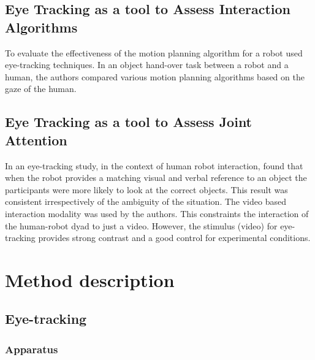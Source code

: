 \documentclass{sig-alternate}
\begin{document}
\subsection{Eye Tracking as a tool to Assess Interaction Algorithms}

To evaluate the effectiveness of the motion planning algorithm for a robot \cite{dehais2011physiological} used eye-tracking techniques. In an object hand-over task between a robot and a human, the authors compared various motion planning algorithms based on the gaze of the human.

\subsection{Eye Tracking as a tool to Assess Joint Attention}

 In an eye-tracking study, in the context of human robot interaction, \cite{staudte2009visual} found
that when the robot provides a matching visual and verbal reference to an object
the participants were more likely to look at the correct objects. This result
was consistent irrespectively of the ambiguity of the situation. The video based interaction modality was used by the authors. This constraints the  interaction of the human-robot dyad to just a video. However, the stimulus (video) for eye-tracking provides strong contrast and a good control for experimental conditions.







\section{Method description}

\subsection{Eye-tracking}


\subsubsection{Apparatus}
\end{document}
